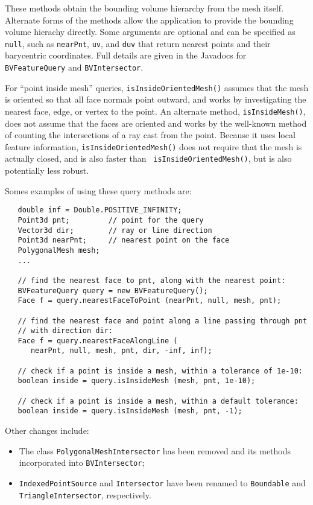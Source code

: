 \documentclass{article}
\begin{document}
These methods obtain the bounding volume hierarchy from the mesh
itself. Alternate forms of the methods allow the application to
provide the bounding volume hierachy directly. Some arguments are
optional and can be specified as {\tt null}, such as {\tt nearPnt},
{\tt uv}, and {\tt duv} that return nearest points and their
barycentric coordinates. Full details are given in the Javadocs for
{\tt BVFeatureQuery} and {\tt BVIntersector}.

For ``point inside mesh'' queries, {\tt isInsideOrientedMesh()} assumes
that the mesh is oriented so that all face normals point outward, and
works by investigating the nearest face, edge, or vertex to the point.
An alternate method, {\tt isInsideMesh()}, does not assume that the
faces are oriented and works by the well-known method of counting the
intersections of a ray cast from the point. Because it uses local
feature information, {\tt isInsideOrientedMesh()} does not require
that the mesh is actually closed, and is also faster than {\tt
isInsideOrientedMesh()}, but is also potentially less robust.

Somes examples of using these query methods are:

\begin{lstlisting}
   double inf = Double.POSITIVE_INFINITY;
   Point3d pnt;         // point for the query
   Vector3d dir;        // ray or line direction
   Point3d nearPnt;     // nearest point on the face
   PolygonalMesh mesh;
   ...

   // find the nearest face to pnt, along with the nearest point:
   BVFeatureQuery query = new BVFeatureQuery(); 
   Face f = query.nearestFaceToPoint (nearPnt, null, mesh, pnt);

   // find the nearest face and point along a line passing through pnt
   // with direction dir:
   Face f = query.nearestFaceAlongLine (
      nearPnt, null, mesh, pnt, dir, -inf, inf);

   // check if a point is inside a mesh, within a tolerance of 1e-10:
   boolean inside = query.isInsideMesh (mesh, pnt, 1e-10);

   // check if a point is inside a mesh, within a default tolerance:
   boolean inside = query.isInsideMesh (mesh, pnt, -1);
\end{lstlisting}

Other changes include:

\begin{itemize}

\item The class {\tt PolygonalMeshIntersector} has been removed and
its methods incorporated into {\tt BVIntersector};

\item {\tt IndexedPointSource} and {\tt Intersector} have been renamed
to {\tt Boundable} and {\tt TriangleIntersector}, respectively.

\end{itemize}
\end{document}
